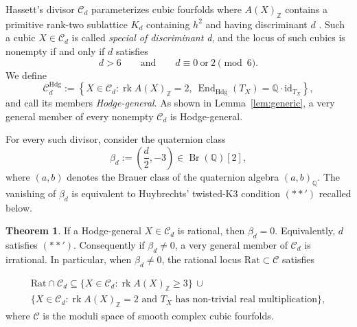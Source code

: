 \documentclass[10pt]{amsart}
\numberwithin{equation}{section}
\theoremstyle{definition}
\newtheorem{theorem}{Theorem}[section]
\theoremstyle{plain}
\numberwithin{theorem}{section}
\DeclareMathOperator{\Br}{Br}
\newcommand{\Q}{\mathbb{Q}}
\newcommand{\Z}{\mathbb{Z}}
\newcommand{\Rat}{\mathrm{Rat}}
\newcommand{\rk}{\operatorname{rk}}
\newcommand{\xspecial}{X\in\mathcal{C}_d}
\begin{document}
Hassett's divisor $\mathcal C_d$ parameterizes cubic fourfolds where $A(X)_{\Z}$ contains a primitive rank-two sublattice $K_d$ containing $h^2$ and having discriminant $d$ \cite[\S3.2]{hassett}. Such a cubic $\xspecial$ is called \emph{special of discriminant d}, and the locus of such cubics is nonempty if and only if $d$ satisfies
\begin{equation}
d>6
\qquad\text{and}\qquad
d\equiv 0\ \text{or}\ 2\pmod 6.
\tag{*}\label{eq}
\end{equation}
We define
\[
\mathcal{C}_d^{\mathrm{Hdg}} := \left\{ X\in\mathcal{C}_d: \operatorname{rk} A(X)_{\Z}=2,\ \operatorname{End}_{\mathrm{Hdg}}(T_{X}) =\mathbb{Q}\cdot\mathrm{id}_{T_X} \right\},
\]
and call its members \emph{Hodge-general}. As shown in Lemma~\ref{lem:generic}, a very general member of every nonempty $\mathcal C_d$ is Hodge-general.

For every such divisor, consider the quaternion class
\[
\beta_d:=\left(\frac d2,-3\right)\in\Br(\Q)[2],
\]
where \((a,b)\) denotes the Brauer class of the quaternion algebra
\((a,b)_{\Q}\).  The vanishing of $\beta_d$ is equivalent to Huybrechts' twisted-K3 condition $(**')$ recalled below.
\begin{theorem}\label{thm:main}
If a Hodge-general $X\in\mathcal C_d$ is rational, then $\beta_d=0$. Equivalently, $d$ satisfies $(**')$. Consequently if $\beta_d\ne0$, a very general member of $\mathcal C_d$ is irrational. In particular, when $\beta_d\ne0$, the rational locus \(\Rat\subset\mathcal C\) satisfies

\begin{multline}\label{eq:containment}
\Rat\cap\mathcal C_d\subseteq\{X\in\mathcal C_d:\rk A(X)_{\Z}\ge3\} \,\cup \\ \{X\in\mathcal C_d: \text{$\rk  A(X)_{\Z}=2$ and $T_X$ has non-trivial real multiplication}\},
\end{multline}
where $\mathcal{C}$ is the moduli space of smooth complex cubic fourfolds.
\end{theorem} 
\end{document}
